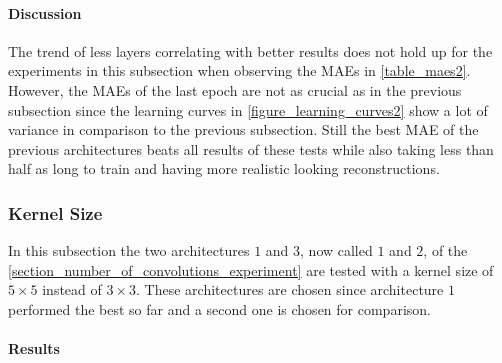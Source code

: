 \paragraph{Discussion}

The trend of less layers correlating with better results does not hold up for the experiments in this subsection when
observing the MAEs in \autoref{table_maes2}. However, the MAEs of the last epoch are not as crucial as in the 
previous subsection since the learning curves in \autoref{figure_learning_curves2} show a lot of variance in 
comparison to the previous subsection. Still the best MAE of the previous architectures beats all results of 
these tests while also taking less than half as long to train and having more realistic looking reconstructions.


\subsubsection{Kernel Size}

In this subsection the two architectures $1$ and $3$, now called $1$ and $2$,
of the \autoref{section_number_of_convolutions_experiment}
are tested with a kernel size of $5\times 5$ instead of $3\times 3$. These architectures are chosen since architecture
$1$ performed the best so far and a second one is chosen for comparison. 

\paragraph{Results} \mbox{}\\

